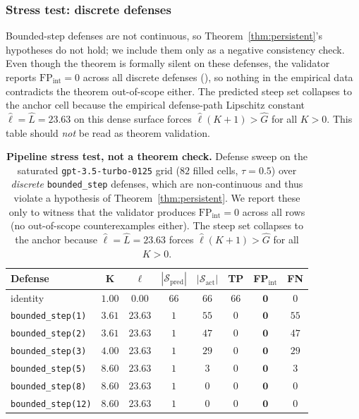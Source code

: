 \documentclass[11pt]{article}
\begin{document}
\subsubsection{Stress test: discrete defenses}
\label{sec:discrete-stress}

Bounded-step defenses are not continuous, so
Theorem~\ref{thm:persistent}'s hypotheses do not hold; we include
them only as a negative consistency check. Even though the
theorem is formally silent on these defenses, the validator
reports $\text{FP}_{\text{int}} = 0$ across all discrete defenses
(), so nothing in the empirical data
contradicts the theorem out-of-scope either. The predicted steep
set collapses to the anchor cell because the empirical
defense-path Lipschitz constant $\hat\ell = \hat L = 23.63$ on
this dense surface forces $\hat\ell(K{+}1) > \hat G$ for all
$K > 0$. This table should \emph{not} be read as theorem
validation.

\begin{table}[h]
\centering
\small
\caption{\textbf{Pipeline stress test, not a theorem check.}
Defense sweep on the saturated \texttt{gpt-3.5-turbo-0125} grid
($82$ filled cells, $\tau = 0.5$) over \emph{discrete}
\texttt{bounded\_step} defenses, which are non-continuous and
thus violate a hypothesis of Theorem~\ref{thm:persistent}. We
report these only to witness that the validator produces
$\text{FP}_{\text{int}} = 0$ across all rows (no out-of-scope
counterexamples either). The steep set collapses to the anchor
because $\hat\ell = \hat L = 23.63$ forces $\hat\ell(K{+}1) > \hat
G$ for all $K > 0$.}
\label{tab:live-sweep}
\begin{tabular}{lccccccc}
\toprule
\textbf{Defense} & $\boldsymbol{K}$ & $\boldsymbol{\ell}$ & $|\mathcal{S}_{\text{pred}}|$ & $|\mathcal{S}_{\text{act}}|$ & \textbf{TP} & \textbf{FP}$_{\text{int}}$ & \textbf{FN} \\
\midrule
identity                           & $1.00$ & $0.00$  & $66$ & $66$ & $66$ & $\mathbf{0}$ & $0$ \\
\texttt{bounded\_step(1)}          & $3.61$ & $23.63$ & $1$  & $55$ & $0$  & $\mathbf{0}$ & $55$ \\
\texttt{bounded\_step(2)}          & $3.61$ & $23.63$ & $1$  & $47$ & $0$  & $\mathbf{0}$ & $47$ \\
\texttt{bounded\_step(3)}          & $4.00$ & $23.63$ & $1$  & $29$ & $0$  & $\mathbf{0}$ & $29$ \\
\texttt{bounded\_step(5)}          & $8.60$ & $23.63$ & $1$  & $3$  & $0$  & $\mathbf{0}$ & $3$  \\
\texttt{bounded\_step(8)}          & $8.60$ & $23.63$ & $1$  & $0$  & $0$  & $\mathbf{0}$ & $0$  \\
\texttt{bounded\_step(12)}         & $8.60$ & $23.63$ & $1$  & $0$  & $0$  & $\mathbf{0}$ & $0$  \\
\bottomrule
\end{tabular}
\end{table}
\end{document}
